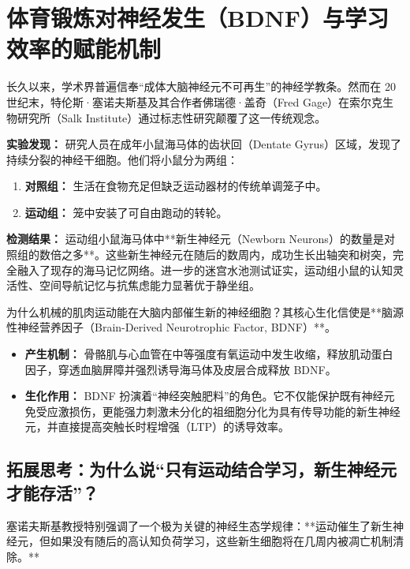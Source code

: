 \documentclass[12pt,a4paper,openany]{ctexbook}
\begin{document}
\section{体育锻炼对神经发生（BDNF）与学习效率的赋能机制}

长久以来，学术界普遍信奉“成体大脑神经元不可再生”的神经学教条。然而在 20 世纪末，特伦斯·塞诺夫斯基及其合作者佛瑞德·盖奇（Fred Gage）在索尔克生物研究所（Salk Institute）通过标志性研究颠覆了这一传统观念。

\begin{casebox}[索尔克研究所海马体神经发生实验]
\textbf{实验发现：}
研究人员在成年小鼠海马体的齿状回（Dentate Gyrus）区域，发现了持续分裂的神经干细胞。他们将小鼠分为两组：
\begin{enumerate}
    \item \textbf{对照组：} 生活在食物充足但缺乏运动器材的传统单调笼子中。
    \item \textbf{运动组：} 笼中安装了可自由跑动的转轮。
\end{enumerate}

\textbf{检测结果：}
运动组小鼠海马体中**新生神经元（Newborn Neurons）的数量是对照组的数倍之多**。这些新生神经元在随后的数周内，成功生长出轴突和树突，完全融入了现存的海马记忆网络。进一步的迷宫水池测试证实，运动组小鼠的认知灵活性、空间导航记忆与抗焦虑能力显著优于静坐组。
\end{casebox}

\begin{keypoint}
为什么机械的肌肉运动能在大脑内部催生新的神经细胞？其核心生化信使是**脑源性神经营养因子（Brain-Derived Neurotrophic Factor, BDNF）**。
\begin{itemize}
    \item \textbf{产生机制：} 骨骼肌与心血管在中等强度有氧运动中发生收缩，释放肌动蛋白因子，穿透血脑屏障并强烈诱导海马体及皮层合成释放 BDNF。
    \item \textbf{生化作用：} BDNF 扮演着“神经突触肥料”的角色。它不仅能保护既有神经元免受应激损伤，更能强力刺激未分化的祖细胞分化为具有传导功能的新生神经元，并直接提高突触长时程增强（LTP）的诱导效率。
\end{itemize}
\end{keypoint}

\subsection*{拓展思考：为什么说“只有运动结合学习，新生神经元才能存活”？}

塞诺夫斯基教授特别强调了一个极为关键的神经生态学规律：**运动催生了新生神经元，但如果没有随后的高认知负荷学习，这些新生细胞将在几周内被凋亡机制清除。**
\end{document}
